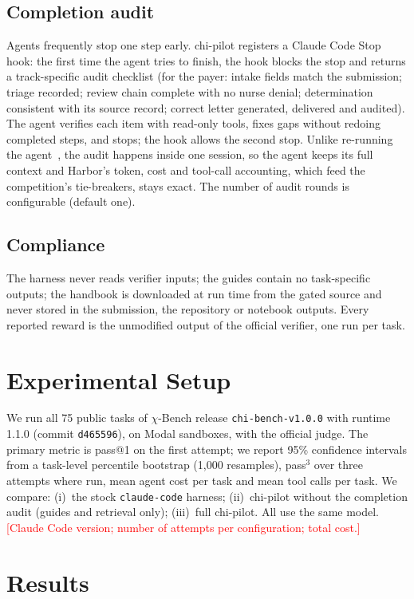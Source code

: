\documentclass[conference]{IEEEtran}
\newcommand{\pending}[1]{\textcolor{red}{[#1]}}
\newcommand{\chib}{$\chi$-Bench}
\begin{document}
\subsection{Completion audit}
Agents frequently stop one step early. chi-pilot registers a Claude Code Stop hook: the first
time the agent tries to finish, the hook blocks the stop and returns a track-specific audit
checklist (for the payer: intake fields match the submission; triage recorded; review chain
complete with no nurse denial; determination consistent with its source record; correct letter
generated, delivered and audited). The agent verifies each item with read-only tools, fixes gaps
without redoing completed steps, and stops; the hook allows the second stop. Unlike re-running
the agent~\cite{reflexion}, the audit happens inside one session, so the agent keeps its full
context and Harbor's token, cost and tool-call accounting, which feed the competition's
tie-breakers, stays exact. The number of audit rounds is configurable (default one).

\subsection{Compliance}
The harness never reads verifier inputs; the guides contain no task-specific outputs; the
handbook is downloaded at run time from the gated source and never stored in the submission,
the repository or notebook outputs. Every reported reward is the unmodified output of the
official verifier, one run per task.

\section{Experimental Setup}
We run all 75 public tasks of \chib{} release \texttt{chi-bench-v1.0.0} with runtime 1.1.0
(commit \texttt{d465596}), on Modal sandboxes, with the official judge. The primary metric is
pass@1 on the first attempt; we report 95\% confidence intervals from a task-level percentile
bootstrap (1,000 resamples), pass$^3$ over three attempts where run, mean agent cost per task
and mean tool calls per task. We compare: (i)~the stock \texttt{claude-code} harness;
(ii)~chi-pilot without the completion audit (guides and retrieval only); (iii)~full chi-pilot.
All use the same model. \pending{Claude Code version; number of attempts per configuration;
total cost.}

\section{Results}

\end{document}
